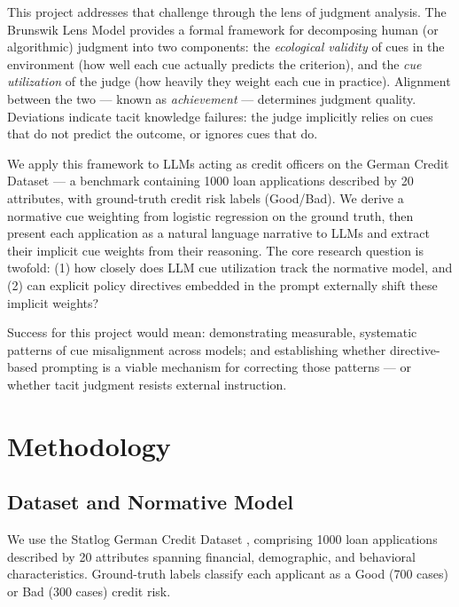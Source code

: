 \documentclass[midterm]{sparreport}
\begin{document}
This project addresses that challenge through the lens of judgment analysis. The Brunswik Lens Model \citep{Brunswik-1956-lens} provides a formal framework for decomposing human (or algorithmic) judgment into two components: the \textit{ecological validity} of cues in the environment (how well each cue actually predicts the criterion), and the \textit{cue utilization} of the judge (how heavily they weight each cue in practice). Alignment between the two — known as \textit{achievement} — determines judgment quality. Deviations indicate tacit knowledge failures: the judge implicitly relies on cues that do not predict the outcome, or ignores cues that do.

We apply this framework to LLMs acting as credit officers on the German Credit Dataset \citep{hofmann1994german} — a benchmark containing 1000 loan applications described by 20 attributes, with ground-truth credit risk labels (Good/Bad). We derive a normative cue weighting from logistic regression on the ground truth, then present each application as a natural language narrative to LLMs and extract their implicit cue weights from their reasoning. The core research question is twofold: (1) how closely does LLM cue utilization track the normative model, and (2) can explicit policy directives embedded in the prompt externally shift these implicit weights?

Success for this project would mean: demonstrating measurable, systematic patterns of cue misalignment across models; and establishing whether directive-based prompting is a viable mechanism for correcting those patterns — or whether tacit judgment resists external instruction.

\section{Methodology}

\subsection{Dataset and Normative Model}

We use the Statlog German Credit Dataset \citep{hofmann1994german}, comprising 1000 loan applications described by 20 attributes spanning financial, demographic, and behavioral characteristics. Ground-truth labels classify each applicant as a Good (700 cases) or Bad (300 cases) credit risk.
\end{document}
